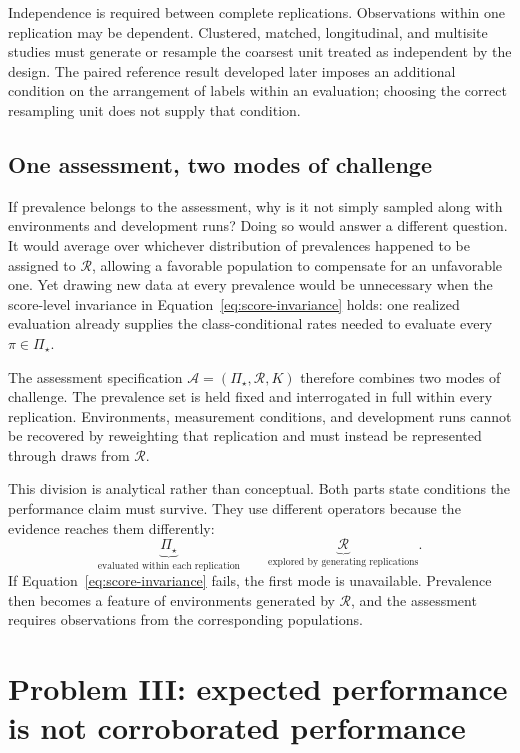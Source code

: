 \documentclass[11pt]{article}
\newcommand{\Regime}{\mathcal{R}}
\newcommand{\Assess}{\mathcal{A}}
\newcommand{\PSet}{\Pi_\star}
\theoremstyle{remark}
\begin{document}
Independence is required between complete replications. Observations within one replication may be dependent. Clustered, matched, longitudinal, and multisite studies must generate or resample the coarsest unit treated as independent by the design. The paired reference result developed later imposes an additional condition on the arrangement of labels within an evaluation; choosing the correct resampling unit does not supply that condition.

\subsection{One assessment, two modes of challenge}

If prevalence belongs to the assessment, why is it not simply sampled along with environments and development runs? Doing so would answer a different question. It would average over whichever distribution of prevalences happened to be assigned to $\Regime$, allowing a favorable population to compensate for an unfavorable one. Yet drawing new data at every prevalence would be unnecessary when the score-level invariance in Equation~\eqref{eq:score-invariance} holds: one realized evaluation already supplies the class-conditional rates needed to evaluate every $\pi\in\PSet$.

The assessment specification $\Assess=(\PSet,\Regime,K)$ therefore combines two modes of challenge. The prevalence set is held fixed and interrogated in full within every replication. Environments, measurement conditions, and development runs cannot be recovered by reweighting that replication and must instead be represented through draws from $\Regime$.

This division is analytical rather than conceptual. Both parts state conditions the performance claim must survive. They use different operators because the evidence reaches them differently:
\[
\underbrace{\PSet}_{\text{evaluated within each replication}}
\qquad
\underbrace{\Regime}_{\text{explored by generating replications}}.
\]
If Equation~\eqref{eq:score-invariance} fails, the first mode is unavailable. Prevalence then becomes a feature of environments generated by $\Regime$, and the assessment requires observations from the corresponding populations.

\section{Problem III: expected performance is not corroborated performance}
\label{sec:support}
\end{document}
